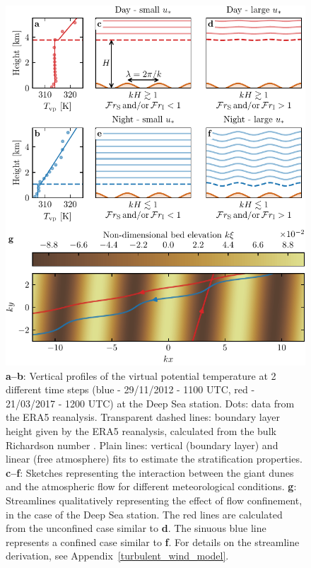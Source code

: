   \begin{figure}
    \centering
    \includegraphics[scale=1]{Figures/Figure4.pdf}
    \caption{\textbf{a--b}: Vertical profiles of the virtual potential temperature at 2 different time steps (blue - 29/11/2012 - 1100 UTC, red - 21/03/2017 - 1200 UTC) at the Deep Sea station. Dots: data from the ERA5 reanalysis. Transparent dashed lines: boundary layer height given by the ERA5 reanalysis, calculated from the bulk Richardson number \citep{seidel2012}. Plain lines: vertical (boundary layer) and linear (free atmosphere) fits to estimate the stratification properties. \textbf{c--f}: Sketches representing the interaction between the giant dunes and the atmospheric flow for different meteorological conditions. \textbf{g}: Streamlines qualitatively representing the effect of flow confinement, in the case of the Deep Sea station. The red lines are calculated from the unconfined case similar to \textbf{d}. The sinuous blue line represents a confined case similar to \textbf{f}. For details on the streamline derivation, see Appendix~\ref{turbulent_wind_model}.}
    \label{Fig4}
  \end{figure}

